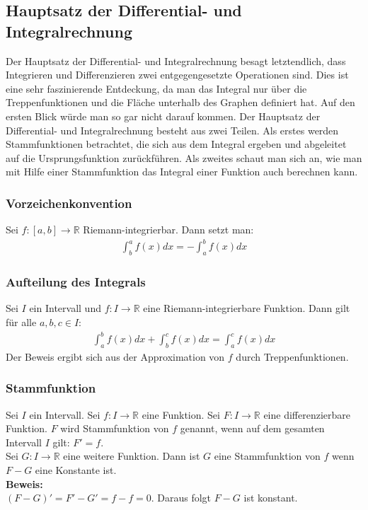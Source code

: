 \documentclass[a4paper]{article}
\begin{document}
\subsection{Hauptsatz der Differential- und Integralrechnung}
Der Hauptsatz der Differential- und Integralrechnung besagt letztendlich, dass Integrieren und Differenzieren zwei entgegengesetzte Operationen sind. Dies ist eine sehr faszinierende Entdeckung, da man das Integral nur über die Treppenfunktionen und die Fläche unterhalb des Graphen definiert hat. Auf den ersten Blick würde man so gar nicht darauf kommen. Der Hauptsatz der Differential- und Integralrechnung besteht aus zwei Teilen. Als erstes werden Stammfunktionen betrachtet, die sich aus dem Integral ergeben und abgeleitet auf die Ursprungsfunktion zurückführen. Als zweites schaut man sich an, wie man mit Hilfe einer Stammfunktion das Integral einer Funktion auch berechnen kann. 
\subsubsection{Vorzeichenkonvention}
Sei $f: [a,b] \rightarrow \mathbb{R}$ Riemann-integrierbar. Dann setzt man:
\begin{align*}
\int_b^a f(x) dx = - \int_a^b f(x) dx 
\end{align*}
\subsubsection{Aufteilung des Integrals}
Sei $I$ ein Intervall und $f: I \rightarrow \mathbb{R}$ eine Riemann-integrierbare Funktion. Dann gilt für alle $a,b,c \in I$:
\begin{align*}
\int_a^b f(x)dx + \int_b^c f(x)dx = \int_a^c f(x)dx
\end{align*}
Der Beweis ergibt sich aus der Approximation von $f$ durch Treppenfunktionen. 
\subsubsection{Stammfunktion}
Sei $I$ ein Intervall. Sei $f: I \rightarrow \mathbb{R}$ eine Funktion. Sei $F: I \rightarrow\mathbb{R}$ eine differenzierbare Funktion. $F$ wird Stammfunktion von $f$ genannt, wenn auf dem gesamten Intervall $I$ gilt: $F' = f$. \\
Sei $G: I \rightarrow \mathbb{R}$ eine weitere Funktion. Dann ist $G$ eine Stammfunktion von $f$ wenn $F-G$ eine Konstante ist. \\
\textbf{Beweis:} \\
$(F-G)' = F' - G' = f-f = 0$. Daraus folgt $F-G$ ist konstant. 
\end{document}
